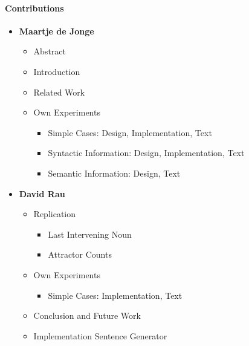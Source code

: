\pagebreak

\paragraph{Contributions}

\begin{itemize}
  \item \textbf{Maartje de Jonge}
  \begin{itemize}
    \item Abstract
    \item Introduction
    \item Related Work
    \item Own Experiments
    \begin{itemize}
       \item Simple Cases: Design, Implementation, Text
       \item Syntactic Information: Design, Implementation, Text
       \item Semantic Information: Design, Text
    \end{itemize}
  \end{itemize}

  \item \textbf{David Rau}
    \begin{itemize}
     \item Replication
      \begin{itemize}
         \item Last Intervening Noun
         \item Attractor Counts
      \end{itemize}    
     \item Own Experiments
    \begin{itemize}
       \item Simple Cases: Implementation, Text
    \end{itemize}        
      \item Conclusion and Future Work
      \item Implementation Sentence Generator
  \end{itemize}


\end{itemize}


